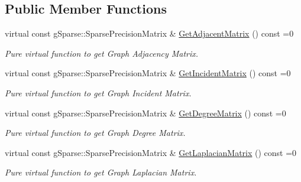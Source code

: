 \subsection*{Public Member Functions}
\begin{DoxyCompactItemize}
\item 
\mbox{\label{classg_sparse_1_1_i_graph_af154d74864aba40ebb121d921090682e}} 
virtual const g\+Sparse\+::\+Sparse\+Precision\+Matrix \& \mbox{\hyperlink{classg_sparse_1_1_i_graph_af154d74864aba40ebb121d921090682e}{Get\+Adjacent\+Matrix}} () const =0
\begin{DoxyCompactList}\small\item\em Pure virtual function to get Graph Adjacency Matrix. \end{DoxyCompactList}\item 
\mbox{\label{classg_sparse_1_1_i_graph_a2c748303c9f5da63fa5da90a1110633f}} 
virtual const g\+Sparse\+::\+Sparse\+Precision\+Matrix \& \mbox{\hyperlink{classg_sparse_1_1_i_graph_a2c748303c9f5da63fa5da90a1110633f}{Get\+Incident\+Matrix}} () const =0
\begin{DoxyCompactList}\small\item\em Pure virtual function to get Graph Incident Matrix. \end{DoxyCompactList}\item 
\mbox{\label{classg_sparse_1_1_i_graph_a24465b20eba67a564b620b21f174da89}} 
virtual const g\+Sparse\+::\+Sparse\+Precision\+Matrix \& \mbox{\hyperlink{classg_sparse_1_1_i_graph_a24465b20eba67a564b620b21f174da89}{Get\+Degree\+Matrix}} () const =0
\begin{DoxyCompactList}\small\item\em Pure virtual function to get Graph Degree Matrix. \end{DoxyCompactList}\item 
\mbox{\label{classg_sparse_1_1_i_graph_a861e57ebfe47eb54236e82f8651f398c}} 
virtual const g\+Sparse\+::\+Sparse\+Precision\+Matrix \& \mbox{\hyperlink{classg_sparse_1_1_i_graph_a861e57ebfe47eb54236e82f8651f398c}{Get\+Laplacian\+Matrix}} () const =0
\begin{DoxyCompactList}\small\item\em Pure virtual function to get Graph Laplacian Matrix. \end{DoxyCompactList}\item 

\end{DoxyCompactItemize}
